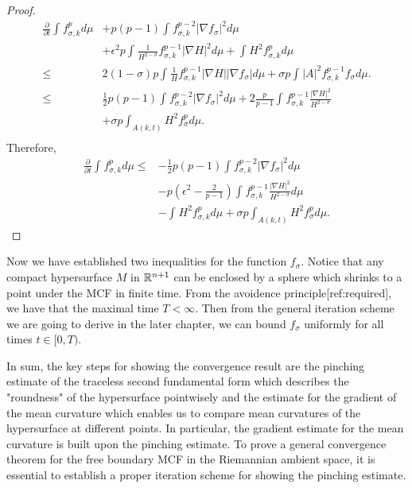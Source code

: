 \begin{proof}
\begin{equation}
\begin{split}
            \frac{\partial }{\partial t}\int_{}^{}f_{\sigma,k }^{p} d \mu 
            &+ p(p-1)\int_{}^{}f_{\sigma,k }^{p-2} \left| \nabla f_\sigma  \right| ^2 d \mu \\
            &+ \epsilon ^2 p \int_{}^{}\frac{1}{H^{2-\sigma }}f_{\sigma,k }^{p-1} \left| \nabla H \right| ^2 d \mu + \int_{}^{}H^2 f_{\sigma,k }^{p} d \mu  \\ 
        \leq & 2(1-\sigma)p \int_{}^{} \frac{1}{H}f_{\sigma,k }^{p-1} \left| \nabla H \right| \left| \nabla f_{\sigma }^{}  \right| d \mu + \sigma p \int_{}^{} \left| A \right| ^2 f_{\sigma,k }^{p-1} f_{\sigma }^{} d \mu .  \\
        \leq & \frac{1}{2} p(p-1) \int_{}^{} f_{\sigma ,k}^{p-2} \left| \nabla f_{\sigma }^{}  \right| ^2 d \mu + 2 \frac{p}{p-1} \int_{}^{} f_{\sigma ,k}^{p-1} \frac{\left| \nabla H \right| ^2}{H^{2-\sigma }} \\
        &+ \sigma p \int_{A(k,t)}^{} H ^2  f_{\sigma }^{p} d \mu .  \\
        \end{split}
        \end{equation}
    Therefore,
    \begin{equation}
    \begin{split}
        \frac{\partial }{\partial t}\int_{}^{}f_{\sigma,k }^{p} d \mu 
    \leq&  -\frac{1}{2} p(p-1) \int_{}^{} f_{\sigma ,k}^{p-2} \left| \nabla f_{\sigma }^{}  \right| ^2 d \mu\\
    & -p\left( \epsilon ^2-\frac{2}{p-1} \right)\int_{}^{} f_{\sigma ,k}^{p-1} \frac{\left| \nabla H \right| ^2}{H^{2-\sigma }} d \mu  \\
    & - \int_{}^{}H^2 f_{\sigma,k }^{p} d \mu +\sigma p \int_{A(k,t)}^{} H ^2  f_{\sigma }^{p} d \mu .
    \end{split}
    \end{equation} 
\end{proof}

Now we have established two inequalities for the function $f_{\sigma }^{} $. Notice that any compact hypersurface $M$ in $\mathbb{R}^{n+1}$ can be enclosed by a sphere which shrinks to a point under the MCF in finite time. From the avoidence principle[ref:required], we have that the maximal time $T< \infty $. Then from the general iteration scheme we are going to derive in the later chapter, we can bound $f_{\sigma }^{} $ uniformly for all times $t \in [0,T)$.

In sum, the key steps for showing the convergence result are the pinching estimate of the traceless second fundamental form which describes the "roundness" of the hypersurface pointwisely and the estimate for the gradient of the mean curvature which enables us to compare mean curvatures of the hypersurface at different points. In particular, the gradient estimate for the mean curvature is built upon the pinching estimate. To prove a general convergence theorem for the free boundary MCF in the Riemannian ambient space, it is essential to establish a proper iteration scheme for showing the pinching estimate.

